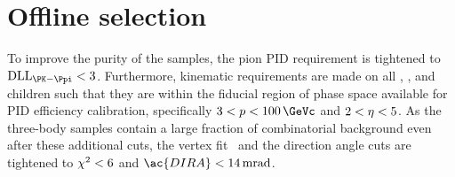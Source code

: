 \begin{table}
  \caption{%
    Requirements made in the \hlttwo\ \DTohhh\ selection.
    The \PDp and \PDsplus candidates are defined according to the three-body 
    mass window after the vertex fit.
    Cuts of the form $x > x_{1},\, x_{2},\, x_{3}$ require that all particles 
    satisfy $x > x_{1}$, at least two satisfy $x > x_{2}$, and at least one 
    satisfies $x > x_{3}$.
    The track \chisq\ criterion is applied in the reconstruction and listed 
    here for completeness.
  }
  \label{tab:prod:sel:online:hlt2_dtohhh_selection}
  \centering
  
\end{table}

\begin{table}
  \caption{%
    Requirements made in the \hlttwo\ \DstToDzpi\ selection.
    The input \PDzero\ candidates are those passing the \PDzero selection 
    defined in \cref{tab:prod:sel:online:hlt2_dztokpi_selection}.
    The track \chisq\ criterion is applied in the reconstruction and listed 
    here for completeness.
  }
  \label{tab:prod:sel:online:hlt2_dsttodzpi_selection}
  \centering
  
\end{table}

\section{Offline selection}
\label{chap:prod:sel:offline}

To improve the purity of the samples, the pion \ac{PID} requirement is 
tightened to $\dllkpi < 3$.
Furthermore, kinematic requirements are made on all \PDzero, \PDplus, and 
\PDsplus children such that they are within the fiducial region of phase space 
available for \ac{PID} efficiency calibration, specifically ${3 < \ptot < 
  \SI{100}{\GeVc}}$ and ${2 < \eta < 5}$.
As the three-body samples contain a large fraction of combinatorial background 
even after these additional cuts, the vertex fit \chisq\ and the direction 
angle cuts are tightened to $\chi^2 < 6$ and $\ac{DIRA} < 
\SI{14}{\milli\radian}$.

